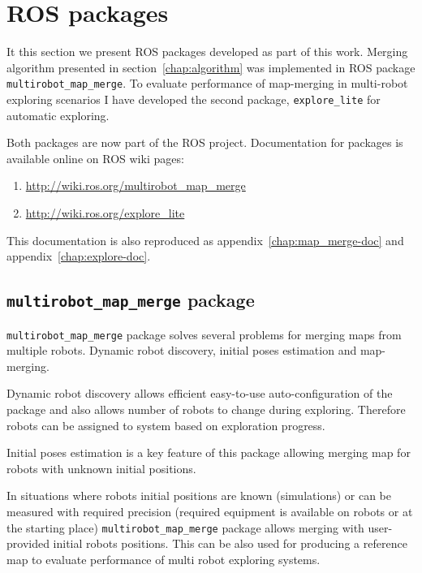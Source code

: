 \chapter{ROS packages}
\label{chap:ros-packages}

It this section we present \gls{ROS} packages developed as part of this work. Merging algorithm presented in section~\ref{chap:algorithm} was implemented in \gls{ROS} package \texttt{multirobot\_map\_merge}. To evaluate performance of map-merging in multi-robot exploring scenarios I have developed the second package, \texttt{explore\_lite} for automatic exploring.

Both packages are now part of the \gls{ROS} project. Documentation for packages is available online on \gls{ROS} wiki pages:

\begin{enumerate}
	\item \url{http://wiki.ros.org/multirobot_map_merge}
	\item \url{http://wiki.ros.org/explore_lite}
\end{enumerate}

This documentation is also reproduced as appendix~\ref{chap:map_merge-doc} and appendix~\ref{chap:explore-doc}.

\section{\texttt{multirobot\_map\_merge} package} %
\label{sec:map_merge-package}

\texttt{multirobot\_map\_merge} package solves several problems for merging maps from multiple robots. Dynamic robot discovery, initial poses estimation and map-merging.

Dynamic robot discovery allows efficient easy-to-use auto-configuration of the package and also allows number of robots to change during exploring. Therefore robots can be assigned to system based on exploration progress.

Initial poses estimation is a key feature of this package allowing merging map for robots with unknown initial positions.

In situations where robots initial positions are known (simulations) or can be measured with required precision (required equipment is available on robots or at the starting place) \texttt{multirobot\_map\_merge} package allows merging with user-provided initial robots positions. This can be also used for producing a reference map to evaluate performance of multi robot exploring systems.

